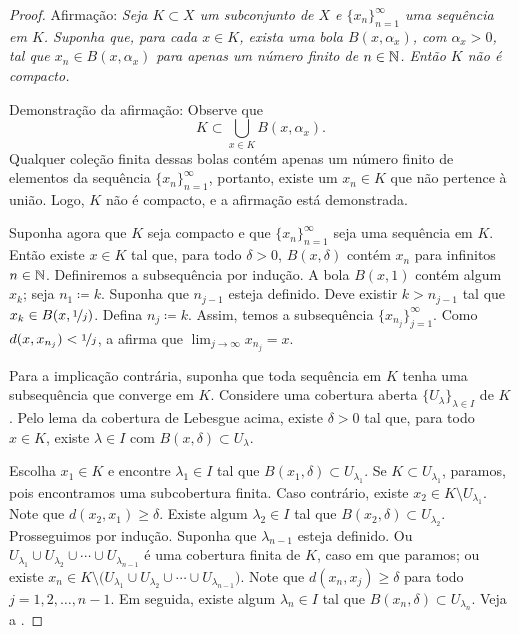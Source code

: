 \begin{proof}
Afirmação: \emph{Seja $K \subset X$ um subconjunto de $X$ e
$\{ x_n \}_{n=1}^\infty$ uma sequência em $K$. Suponha que, para cada
$x \in K$, exista uma bola $B(x,\alpha_x)$, com $\alpha_x > 0$, tal que
$x_n \in B(x,\alpha_x)$ para apenas um número finito de $n \in {\mathbb{N}}$.
Então $K$ não é compacto.}

Demonstração da afirmação:
Observe que
\begin{equation*}
K \subset \bigcup_{x \in K} B(x,\alpha_x) .
\end{equation*}
Qualquer coleção finita dessas bolas contém apenas um número finito de
elementos da sequência $\{ x_n \}_{n=1}^\infty$,
portanto, existe um $x_n \in K$
que não pertence à união. Logo, $K$ não é compacto, e a afirmação está
demonstrada.

Suponha agora que $K$ seja compacto e que $\{ x_n \}_{n=1}^\infty$ seja
uma sequência em $K$.
Então existe $x \in K$ tal que, para todo $\delta > 0$,
$B(x,\delta)$ contém $x_n$ para infinitos $n \in {\mathbb{N}}$.
Definiremos a subsequência por indução.
A bola $B(x,1)$ contém algum $x_k$; seja $n_1 \coloneqq k$.
Suponha que $n_{j-1}$ esteja definido.
Deve existir $k > n_{j-1}$
tal que $x_k \in B(x,\nicefrac{1}{j})$. Defina
$n_j \coloneqq k$.
Assim, temos a subsequência $\{ x_{n_j} \}_{j=1}^\infty$.
Como
$d(x,x_{n_j}) < \nicefrac{1}{j}$, a  afirma que
$\lim_{j\to\infty} x_{n_j} = x$.

Para a implicação contrária, suponha que toda sequência em $K$
tenha uma subsequência que converge em $K$.
Considere uma cobertura aberta $\{ U_\lambda \}_{\lambda \in I}$ de $K$.
Pelo lema da cobertura de Lebesgue acima, existe $\delta > 0$
tal que, para todo $x \in K$, existe $\lambda \in I$ com
$B(x,\delta) \subset U_\lambda$.

Escolha $x_1 \in K$ e encontre $\lambda_1 \in I$ tal que
$B(x_1,\delta) \subset U_{\lambda_1}$.
Se $K \subset U_{\lambda_1}$, paramos, pois encontramos uma
subcobertura finita.
Caso contrário, existe
$x_2 \in K \setminus U_{\lambda_1}$.
Note que $d(x_2,x_1) \geq \delta$.
Existe algum $\lambda_2 \in I$ tal que
$B(x_2,\delta) \subset U_{\lambda_2}$.
Prosseguimos por indução. Suponha que $\lambda_{n-1}$ esteja definido.
Ou
$U_{\lambda_1} \cup
U_{\lambda_2} \cup \cdots \cup
U_{\lambda_{n-1}}$ é uma cobertura finita de $K$, caso em que
paramos; ou existe
$x_n \in K \setminus \bigl( U_{\lambda_1} \cup
U_{\lambda_2} \cup \cdots \cup
U_{\lambda_{n-1}}\bigr)$.
Note que $d(x_n,x_j) \geq \delta$ para todo $j = 1,2,\ldots,n-1$.
Em seguida, existe algum $\lambda_n \in I$
tal que $B(x_n,\delta) \subset U_{\lambda_n}$.
Veja a .


\end{proof}
